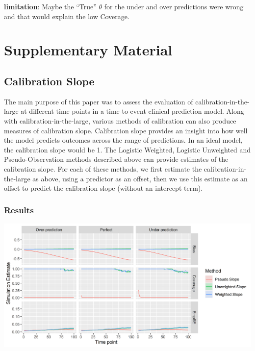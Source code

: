 \documentclass[
]{article}
\begin{document}
\textbf{limitation}: Maybe the ``True'' \(\theta\) for the under and over predictions were wrong and that would explain the low Coverage.

\hypertarget{appendix-appendices}{%
\appendix}


\hypertarget{chapIPCWlogisticsupp}{%
\section{Supplementary Material}\label{chapIPCWlogisticsupp}}

\hypertarget{calibration-slope}{%
\subsection{Calibration Slope}\label{calibration-slope}}

The main purpose of this paper was to assess the evaluation of calibration-in-the-large at different time points in a time-to-event clinical prediction model. Along with calibration-in-the-large, various methods of calibration can also produce measures of calibration slope. Calibration slope provides an insight into how well the model predicts outcomes across the range of predictions. In an ideal model, the calibration slope would be 1. The Logistic Weighted, Logistic Unweighted and Pseudo-Observation methods described above can provide estimates of the calibration slope. For each of these methods, we first estimate the calibration-in-the-large as above, using a predictor as an offset, then we use this estimate as an offset to predict the calibration slope (without an intercept term).

\hypertarget{results-2}{%
\subsubsection{Results}\label{results-2}}

\includegraphics[width=54.68in]{figure/IPCW_Logistic/SlopePlot_b(1)_g(0)_e(0.5)}
\end{document}
